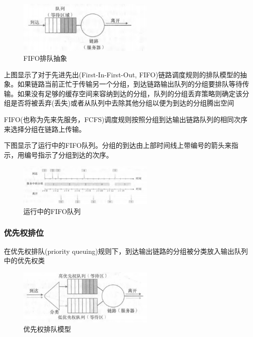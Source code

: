 \begin{figure}[!htbp]
    \centering
    \includegraphics[width=0.6\textwidth]{image/chapter04/FIFO排队抽象.png}
    \caption{FIFO排队抽象}
\end{figure}

    上图显示了对于先进先出(First-In-First-Out, FIFO)链路调度规则的排队模型的抽象。如果链路当前正忙于传输另一个分组，到达链路输出队列的分组要排队等待传输。如果没有足够的缓存空间来容纳到达的分组，队列的分组丢弃策略则确定该分组是否将被丢弃(丢失)或者从队列中去除其他分组以便为到达的分组腾出空间

    FIFO(也称为先来先服务，FCFS)调度规则按照分组到达输出链路队列的相同次序来选择分组在链路上传输。

    下图显示了运行中的FIFO队列。分组的到达由上部时间线上带编号的箭头来指示，用编号指示了分组到达的次序。

\begin{figure}[!htbp]
    \centering
    \includegraphics[width=0.6\textwidth]{image/chapter04/运行中的FIFO队列.png}
    \caption{运行中的FIFO队列}
\end{figure}

\subsubsection{优先权排位}

    在优先权排队(priority queuing)规则下，到达输出链路的分组被分类放入输出队列中的优先权类

\begin{figure}[!htbp]
    \centering
    \includegraphics[width=0.6\textwidth]{image/chapter04/优先权排队模型.png}
    \caption{优先权排队模型}
\end{figure}

